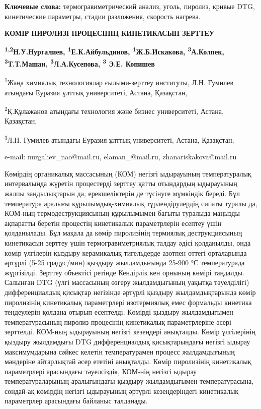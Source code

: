 {\bfseries Ключевые слова:} термогравиметрический анализ, уголь, пиролиз,
кривые DTG, кинетические параметры, стадии разложения, скорость нагрева.

\begin{center}
{\large\bfseries КӨМІР ПИРОЛИЗІ ПРОЦЕСІНІҢ КИНЕТИКАСЫН ЗЕРТТЕУ}

{\bfseries \textsuperscript{1,2}Н.У.Нургалиев\envelope, \textsuperscript{1}Е.К.Айбульдинов\envelope, \textsuperscript{1}Ж.Б.Искакова\envelope, \textsuperscript{3}А.Колпек, \textsuperscript{3}Т.Т.Машан, \textsuperscript{3}Л.А.Кусепова, \textsuperscript{3} Э.Е. Копишев}

\textsuperscript{1}Жаңа химиялық технологиялар ғылыми-зерттеу институты,
Л.Н. Гумилев атындағы Еуразия ұлттық университеті, Астана, Қазақстан,

\textsuperscript{2}Қ.Құлажанов атындағы технология және бизнес
университеті, Астана, Қазақстан,

\textsuperscript{3}Л.Н. Гумилев атындағы Еуразия ұлттық университеті,
Астана, Қазақстан,

e-mail: nurgaliev\_nao@mail.ru, elaman\_@mail.ru, zhanariskakova@mail.ru
\end{center}

Көмірдің органикалық массасының (КОМ) негізгі ыдырауының температуралық
интервалында жүретін процестерді зерттеу қатты отындардың ыдырауының
жалпы заңдылықтарын да, ерекшеліктерін де түсінуге мүмкіндік береді. Бұл
температура аралығы құрылымдық-химиялық түрлендірулердің сипаты туралы
да, КОМ-ның термодеструкциясының құрылымымен бағыты туралыда маңызды
ақпаратты беретін процестің кинетикалық параметрлерін есептеу үшін
қолданылады. Бұл мақала да көмір пиролизінің термиялық деструкциясының
кинетикасын зерттеу үшін термогравиметриялық талдау әдісі қолданылды,
онда көмір үлгілерін қыздыру керамикалық тигельдерде азотпен оттегі
орталарында әртүрлі (5-25 градус/мин) қыздыру жылдамдығында 25-900 °С
температурада жүргізілді. Зерттеу объектісі ретінде Кендірлік кен
орнының көмірі таңдалды. Салынған DTG (үлгі массасының өзгеру
жылдамдығының уақытқа тәуелділігі) дифференциалдық қисықтар негізінде
әртүрлі қыздыру жылдамдықтарында көмір пиролизінің кинетикалық
параметрлері изотермиялық емес формальды кинетика теңдеулерін қолдана
отырып есептелді. Көмірді қыздыру жылдамдығымен температурасының пиролиз
процесінің кинетикалық параметрлеріне әсері зерттелді. КОМ-ның
ыдырауының негізгі кезеңдері анықталды. Көмір үлгілерінің қыздыру
жылдамдығы DTG дифференциалдық қисықтарындағы негізгі ыдырау
максимумдарына сәйкес келетін температурамен процесс жылдамдығының
мәндеріне айтарлықтай әсер ететіні анықталды. Көмір пиролизінің
кинетикалық параметрлері арасындағы тәуелсіздік, КОМ-нің негізгі ыдырау
температураларының аралығындағы қыздыру жылдамдығымен температурасына,
сондай-ақ көмірдің негізгі ыдырауының әртүрлі кезеңдеріндегі кинетикалық
параметрлер арасындағы байланыс талданады.

